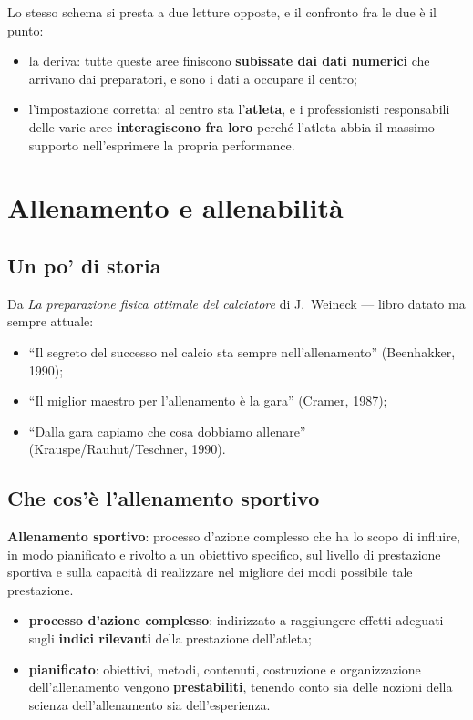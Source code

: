 Lo stesso schema si presta a due letture opposte, e il confronto fra le due è il punto:

\begin{itemize}
  \item la deriva: tutte queste aree finiscono \textbf{subissate dai dati numerici} che arrivano dai
    preparatori, e sono i dati a occupare il centro;
  \item l'impostazione corretta: al centro sta l'\textbf{atleta}, e i professionisti responsabili
    delle varie aree \textbf{interagiscono fra loro} perché l'atleta abbia il massimo supporto
    nell'esprimere la propria performance.
\end{itemize}

\section{Allenamento e allenabilità}

\subsection{Un po' di storia}

Da \textit{La preparazione fisica ottimale del calciatore} di J.~Weineck --- libro datato ma sempre
attuale:

\begin{itemize}
  \item ``Il segreto del successo nel calcio sta sempre nell'allenamento'' (Beenhakker, 1990);
  \item ``Il miglior maestro per l'allenamento è la gara'' (Cramer, 1987);
  \item ``Dalla gara capiamo che cosa dobbiamo allenare'' (Krauspe/Rauhut/Teschner, 1990).
\end{itemize}

\subsection{Che cos'è l'allenamento sportivo}

\textbf{Allenamento sportivo}: processo d'azione complesso che ha lo scopo di influire, in modo
pianificato e rivolto a un obiettivo specifico, sul livello di prestazione sportiva e sulla capacità
di realizzare nel migliore dei modi possibile tale prestazione.

\begin{itemize}
  \item \textbf{processo d'azione complesso}: indirizzato a raggiungere effetti adeguati sugli
    \textbf{indici rilevanti} della prestazione dell'atleta;
  \item \textbf{pianificato}: obiettivi, metodi, contenuti, costruzione e organizzazione
    dell'allenamento vengono \textbf{prestabiliti}, tenendo conto sia delle nozioni della scienza
    dell'allenamento sia dell'esperienza.
\end{itemize}


